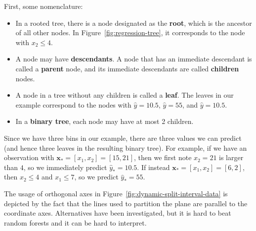 \documentclass[12pt, a4paper]{article}
\theoremstyle{definition}
\begin{document}
	First, some nomenclature:
	\begin{itemize}
		\item In a rooted tree, there is a node designated as the \textbf{root},
		which is the ancestor of all other nodes. In Figure~\ref{fig:regression-tree},
		it corresponds to the node with $x_2 \leq 4$.
		\item A node may have \textbf{descendants}. A node that has an immediate
		descendant is called a \textbf{parent} node, and its immediate descendants
		are called \textbf{children} nodes.
		\item A node in a tree without any children is called a \textbf{leaf}.
		The leaves in our example correspond to the nodes with $\hat{y}=10.5$, $\hat{y}=55$,
		and $\hat{y}=10.5$.
		\item In a \textbf{binary tree}, each node may have at most 2 children.
	\end{itemize}
	Since we have three bins in our example, there are three values we can predict
	(and hence three leaves in the resulting binary tree). For example,
	if we have an observation with $\bm{x}_* = [x_1 , x_2] = [15, 21]$, then we first
	note $x_2=21$ is larger than $4$, so we immediately predict $\hat{y}_* = 10.5$.
	If instead $\bm{x}_* = [x_1 ,  x_2] = [6 , 2]$, then $x_2\leq 4$ and $x_1\leq 7$,
	so we predict $\hat{y}_* = 55$.
	
	The usage of orthogonal axes in Figure~\ref{fig:dynamic-split-interval-data}
	is depicted by the fact that the lines used to partition the plane are parallel
	to the coordinate axes. Alternatives have been investigated, but it is hard
	to beat random forests and it can be hard to interpret.
	
\end{document}
